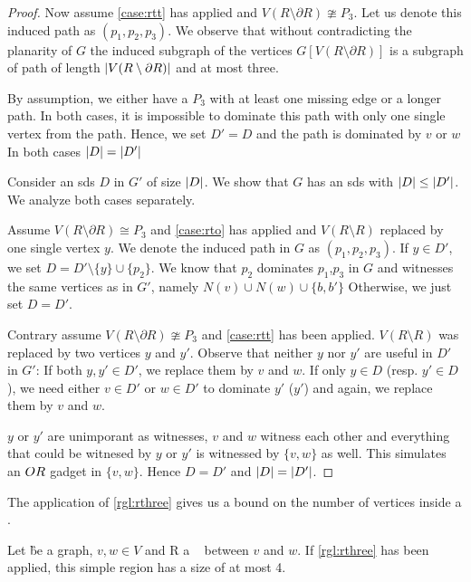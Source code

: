 \begin{proof}
         Now assume \cref{case:rtt} has applied and $V(R \setminus \partial R) \ncong P_3$. 
         Let us denote this induced path as $(p_1,p_2,p_3)$. We observe that without contradicting the planarity of $G$ the induced subgraph of the vertices $G[V(R \setminus \partial R)]$ is a subgraph of path of length $\abs{V(R \setminus \partial R)}$ and at most three. 

          By assumption, we either have a $P_3$ with at least one missing edge or a longer path. 
          In both cases, it is impossible to dominate this path with only one single vertex from the path.
         Hence, we set $D' = D$ and the path is dominated by $v$ or $w$
         In both cases $\abs{D} = \abs{D'}$
         
         Consider an sds $D$ in $G'$ of size $\abs{D}$. 
         We show that $G$ has an sds with $\abs{D} \leq \abs{D'}$. 
         We analyze both cases separately.

         Assume $V(R \setminus \partial R) \cong P_3$ and \cref{case:rto} has applied and $V(R \setminus R)$ replaced by one single vertex $y$. 
         We denote the induced path in $G$ as $(p_1,p_2,p_3)$.
         If $y \in D'$, we set $D = D' \setminus \{y\} \cup \{p_2\}$. 
         We know that $p_2$ dominates $p_1$,$p_3$ in $G$ and witnesses the same vertices as in $G'$, namely $N(v) \cup N(w) \cup \{b, b'\}$
         Otherwise, we just set $D = D'$. 

         Contrary assume $V(R \setminus \partial R) \ncong P_3$ and \cref{case:rtt} has been applied.
         $V(R \setminus R)$ was replaced by two vertices $y$ and $y'$.
         Observe that neither $y$ nor $y'$ are useful in $D'$ in $G'$: If both $y, y' \in D'$, we replace them by $v$ and $w$.
         If only $y \in D$ (resp. $y' \in D$), we need either $v \in D'$ or $w \in D'$ to dominate $y'$ ($y'$) and again, we replace them by $v$ and $w$. 

         $y$ or $y'$ are unimporant as witnesses, $v$ and $w$ witness each other and everything that could be witnesed by $y$ or $y'$ is witnessed by $\{v,w\}$ as well.
         This simulates an $\mathnormal{OR}$ gadget in $\{v, w\}$.
        Hence $D = D'$ and $\abs{D} = \abs{D'}$.
\end{proof}
    
The application of \cref{rgl:rthree} gives us a bound on the number of vertices inside a \sr. 
\begin{corollary}\label{lemma:simpleregionbound}
    Let \G be a graph, $v, w\in V$ and R a \sr~ between $v$ and $w$. If \cref{rgl:rthree} has been applied, this simple region has a size of at most 4.
\end{corollary}

